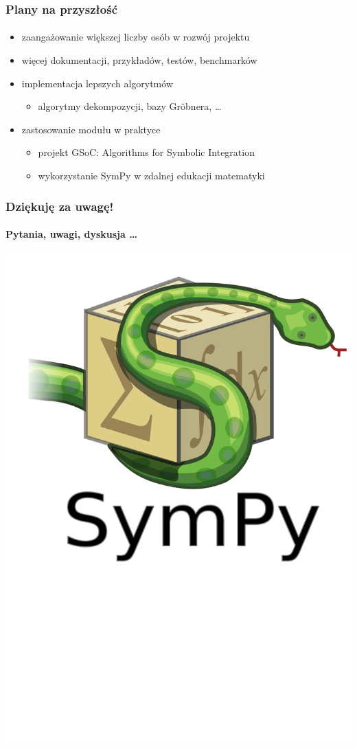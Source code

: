 \documentclass{beamer}
\begin{document}
\begin{frame}
    \frametitle{Plany na przyszłość}
    \framesubtitle{}

    \begin{itemize}
        \item zaangażowanie większej liczby osób w rozwój projektu
        \item więcej dokumentacji, przykładów, testów, benchmarków
        \item implementacja lepszych algorytmów
            \begin{itemize}
                \item algorytmy dekompozycji, bazy Gr\"{o}bnera, \ldots
            \end{itemize}
        \item zastosowanie modułu w praktyce
            \begin{itemize}
                \item projekt GSoC: Algorithms for Symbolic Integration
                \item wykorzystanie SymPy w zdalnej edukacji matematyki
            \end{itemize}
    \end{itemize}
\end{frame}

\begin{frame}
    \frametitle{Dziękuję za uwagę!}
    \framesubtitle{Pytania, uwagi, dyskusja \ldots}

    \begin{center}
        \includegraphics[scale=0.2]{images/sympy-logo.pdf}
    \end{center}
\end{frame}
\end{document}
